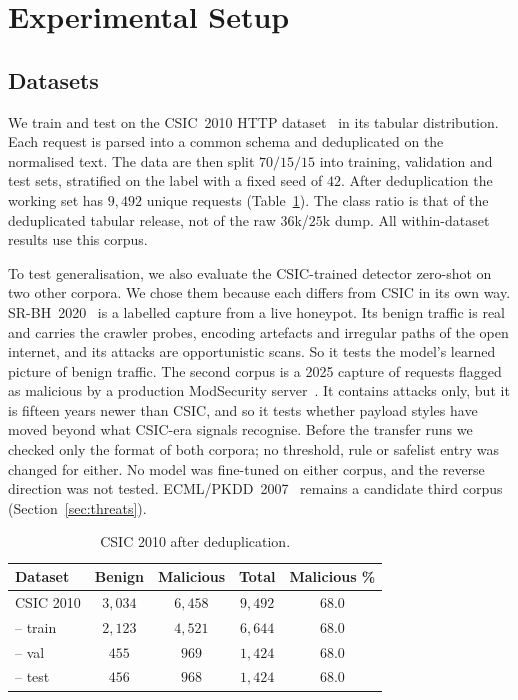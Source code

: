 \documentclass[preprint,11pt]{elsarticle}
\let\footnotesize\normalsize
\begin{document}
\section{Experimental Setup}
\label{sec:setup}
\subsection{Datasets}
\label{sec:datasets}
We train and test on the CSIC~2010 HTTP dataset~\cite{gimenez2010csic} in
its tabular distribution. Each request is parsed into a common schema and
deduplicated on the normalised text. The data are then split $70/15/15$
into training, validation and test sets, stratified on the label with a
fixed seed of $42$. After deduplication the working set has $9{,}492$
unique requests (Table~\ref{tab:datasets}). The class ratio is that of the
deduplicated tabular release, not of the raw $36$k/$25$k dump. All
within-dataset results use this corpus.

To test generalisation, we also evaluate the CSIC-trained detector
zero-shot on two other corpora. We chose them because each differs from
CSIC in its own way. SR-BH~2020~\cite{srbh2020} is a labelled capture from
a live honeypot. Its benign traffic is real and carries the crawler probes,
encoding artefacts and irregular paths of the open internet, and its
attacks are opportunistic scans. So it tests the model's learned picture of
benign traffic. The second corpus is a 2025 capture of requests flagged as
malicious by a production ModSecurity server~\cite{modsec30day2025}. It
contains attacks only, but it is fifteen years newer than CSIC, and so it
tests whether payload styles have moved beyond what CSIC-era signals
recognise. Before the transfer runs we checked only the format of both
corpora; no threshold, rule or safelist entry was changed for either. No
model was fine-tuned on either corpus, and the reverse direction was not
tested. ECML/PKDD~2007~\cite{pkdd2007} remains a candidate third corpus
(Section~\ref{sec:threats}).

\begin{table}[t]
\centering
\footnotesize
\caption{CSIC 2010 after deduplication.}
\label{tab:datasets}
\begin{tabular}{@{}lcccc@{}}
\toprule
Dataset & Benign & Malicious & Total & Malicious \% \\
\midrule
CSIC 2010 & $3{,}034$ & $6{,}458$ & $9{,}492$ & $68.0$ \\
\;-- train & $2{,}123$ & $4{,}521$ & $6{,}644$ & $68.0$ \\
\;-- val   & $455$     & $969$     & $1{,}424$ & $68.0$ \\
\;-- test  & $456$     & $968$     & $1{,}424$ & $68.0$ \\
\bottomrule
\end{tabular}
\end{table}
\end{document}
